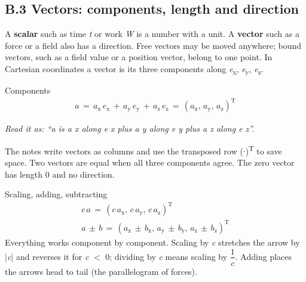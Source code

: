 \documentclass[11pt]{article}
\begin{document}
\begin{keepsection}
\section{B.3 Vectors: components, length and direction}

A \textbf{scalar} such as time \textit{t} or work \textit{W} is a number with a unit. A \textbf{vector} such as a force or a field also has a direction. Free vectors may be moved anywhere; bound vectors, such as a field value or a position vector, belong to one point. In Cartesian coordinates a vector is its three components along \textit{e}\textsubscript{x}, \textit{e}\textsubscript{y}, \textit{e}\textsubscript{z}.

\begin{equationcard}{Components}
\[ \begin{gathered} {a}\, =\, {a}_{\mathrm{x}}\, {e}_{\mathrm{x}}\, +\, {a}_{\mathrm{y}}\, {e}_{\mathrm{y}}\, +\, {a}_{\mathrm{z}}\, {e}_{\mathrm{z}}\, =\, ({a}_{\mathrm{x}},\, {a}_{\mathrm{y}},\, {a}_{\mathrm{z}})^{\mathrm{T}} \end{gathered} \]
{\small \emph{Read it as: “a is a x along e x plus a y along e y plus a z along e z”.}\par The notes write vectors as columns and use the transposed row (\ensuremath{\cdot})\textsuperscript{T} to save space. Two vectors are equal when all three components agree. The zero vector has length 0 and no direction.}
\end{equationcard}

\begin{equationcard}{Scaling, adding, subtracting}
\[ \begin{gathered} {c}\, {a}\, =\, ({c}\, {a}_{\mathrm{x}},\, {c}\, {a}_{\mathrm{y}},\, {c}\, {a}_{\mathrm{z}})^{\mathrm{T}} \\ {a}\, \pm \, {b}\, =\, ({a}_{\mathrm{x}}\, \pm \, {b}_{\mathrm{x}},\, {a}_{\mathrm{y}}\, \pm \, {b}_{\mathrm{y}},\, {a}_{\mathrm{z}}\, \pm \, {b}_{\mathrm{z}})^{\mathrm{T}} \end{gathered} \]
{\small Everything works component by component. Scaling by \textit{c} stretches the arrow by |\textit{c}| and reverses it for \textit{c} \ensuremath{<} 0; dividing by \textit{c} means scaling by {\small\ensuremath{\dfrac{1}{{c}}}}. Adding places the arrows head to tail (the parallelogram of forces).}
\end{equationcard}


\end{keepsection}
\end{document}
